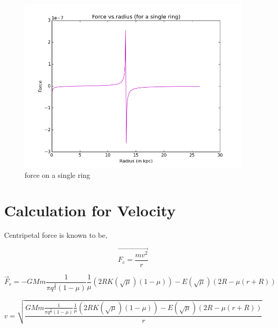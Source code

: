 \begin{figure}[h]
\centering
\includegraphics[scale=0.5]{force41R} 
\caption{force on a single ring }
\end{figure}



\section{Calculation for Velocity }

Centripetal force is known to be,

\begin{center}
\begin{equation}
\vec{F_{c} = \frac{m v^2 }{r}}
\end{equation}

\begin{equation}
\vec{F}_{r} = - GMm \frac{1}{\pi q^ \frac{3}{2} (1- \mu)} \frac{1}{\mu} (2 R K(\sqrt{\mu}) (1 - \mu))- E (\sqrt{\mu}) (2 R - \mu (r + R))
\end{equation}

\begin{equation}
v = \sqrt{\frac{GMm \frac{1}{\pi q^ \frac{3}{2} (1- \mu)} \frac{1}{\mu} (2 R K(\sqrt{\mu}) (1 - \mu))- E (\sqrt{\mu}) (2 R - \mu (r + R))}{r}}
\end{equation}

\end{center}

